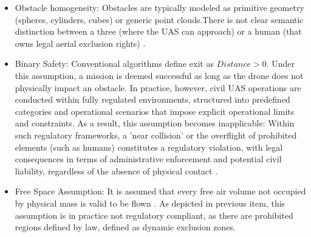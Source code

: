 \documentclass[a4paper, 11pt]{article}
\newcommand\C[1]\null
\begin{document}
\begin{itemize}
    \item Obstacle homogeneity: Obstacles are typically modeled as primitive geometry (spheres, cylinders, cubes) or generic point clouds.There is not clear semantic distinction between a three (where the UAS can approach) or a human (that owns legal aerial exclusion  rights) \C{referencia Xabi [3]}.
    \item Binary Safety: Conventional algorithms define exit as $Distance > 0$. Under this assumption, a mission is deemed successful as long as the drone does not physically impact an obstacle. In practice, however, civil UAS operations are conducted within fully regulated environments, structured into predefined categories and operational scenarios that impose explicit operational limits and constraints. As a result, this assumption becomes inapplicable: Within such regulatory frameworks, a 'near collision' \cite{international2016annex} or the overflight of prohibited elements (such as humans) constitutes a regulatory violation, with legal consequences in terms of administrative enforcement and potential civil liability, regardless of the absence of physical contact \cite{EU2019_947}.  
    
    \item Free Space Assumption: It is assumed that every free air volume not occupied by physical mass is valid to be flown \C{referencia Xabi [2]}. As depicted in previous item, this assumption is in practice not regulatory compliant, as there are prohibited regions defined by law, defined as dynamic exclusion zones. 
\end{itemize}


\end{document}
